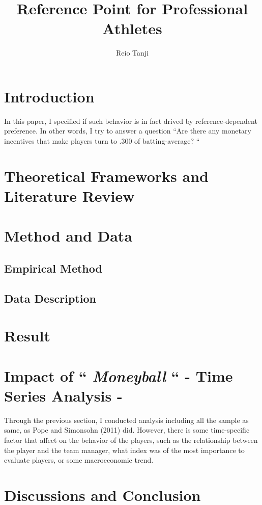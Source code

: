 \documentclass[dvipdfmx]{article}
\begin{document}
\title{Reference Point for Professional Athletes}
\author{Reio Tanji}
\date{}
\maketitle

\large

\section{Introduction}



In this paper, I specified if such behavior is in fact drived by
reference-dependent preference. In other words, I try to answer
a question ``Are there any monetary incentives that make players
turn to .300 of batting-average? ``

\section{Theoretical Frameworks and Literature Review}



\section{Method and Data}

 \subsection{Empirical Method}

 \subsection{Data Description}





\section{Result}



\section{Impact of `` \textit{Moneyball} ``
- Time Series Analysis -}

Through the previous section, I conducted analysis including
all the sample as same, as Pope and Simonsohn (2011) did.
However, there is some time-specific factor that affect on
the behavior of the players, such as the relationship
between the player and the team manager, what index
was of the most importance to evaluate players, or some
macroeconomic trend.


\section{Discussions and Conclusion}
\end{document}
